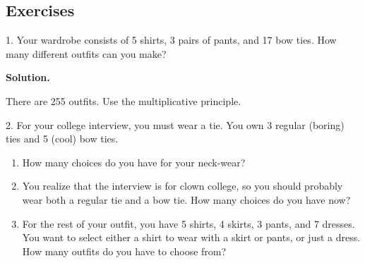 \documentclass[10pt,]{book}
\theoremstyle{plain}
\theoremstyle{definition}
\theoremstyle{definition}
\theoremstyle{definition}
\numberwithin{equation}{section}
\begin{document}
\subsection[Exercises]{Exercises}\label{exercises-4}
\begin{exerciselist}
\item[1.]\hypertarget{exercise-42}{}
          Your wardrobe consists of 5 shirts, 3 pairs of pants, and 17 bow ties. How many different outfits can you make?
\par\smallskip
\par\smallskip
\noindent\textbf{Solution.}\hypertarget{solution-68}{}\quad

          There are 255 outfits. Use the multiplicative principle.
\item[2.]\hypertarget{exercise-43}{}
          For your college interview, you must wear a tie. You own 3 regular (boring) ties and 5 (cool) bow ties.


          \leavevmode%
\begin{enumerate}[label=(\alph*)]
\item\hypertarget{li-381}{}
              How many choices do you have for your neck-wear?
\item\hypertarget{li-382}{}
                You realize that the interview is for clown college, so you should probably wear both a regular tie and a bow tie. How many choices do you have now?
\item\hypertarget{li-383}{}
                For the rest of your outfit, you have 5 shirts, 4 skirts, 3 pants, and 7 dresses. You want to select either a shirt to wear with a skirt or pants, or just a dress. How many outfits do you have to choose from?
\end{enumerate}


\end{exerciselist}
\end{document}
